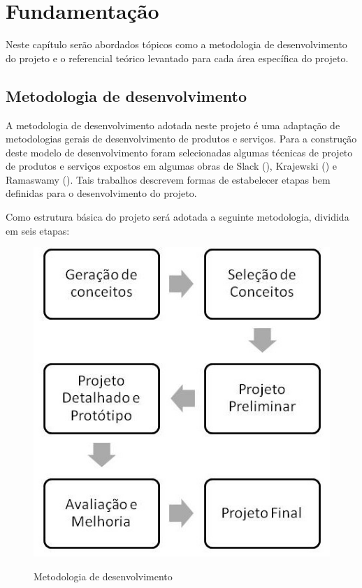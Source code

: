 \chapter{Fundamentação}
  
  Neste capítulo serão abordados tópicos como a metodologia de desenvolvimento do projeto e o referencial teórico levantado
  para cada área específica do projeto.
  
  \section{Metodologia de desenvolvimento}
  
  A metodologia de desenvolvimento adotada neste projeto é uma adaptação de metodologias gerais de desenvolvimento de
  produtos e serviços. Para a construção deste modelo de desenvolvimento foram selecionadas algumas técnicas de projeto
  de produtos e serviços expostos em algumas obras de Slack (\citeyear{slack99}), Krajewski (\citeyear{krajewski96}) e
  Ramaswamy (\citeyear{ramaswamy96}). Tais trabalhos descrevem formas de estabelecer etapas bem definidas para o desenvolvimento do projeto.
  
  Como estrutura básica do projeto será adotada a seguinte metodologia, dividida em seis etapas:
  
  \begin{figure}[h]
  \begin{center}

  \includegraphics[scale=0.3]{editaveis/figuras/metodologia_de_desenvolvimento}
  \label{Metodologia de desenvolvimento}
  \caption{Metodologia de desenvolvimento}
  \end{center}
  \end{figure}
  \FloatBarrier
  
